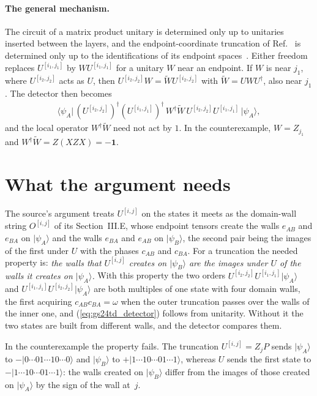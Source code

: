 \documentclass{article}
\begin{document}
\paragraph{The general mechanism.} The circuit of a matrix product unitary is
determined only up to unitaries inserted between the layers, and the
endpoint-coordinate truncation of Ref.~\cite{FrancoRubio2025MPUGauging} is
determined only up to the identifications of its endpoint
spaces~\cite{gap:fbc25_truncated_symmetry_endpoint_unitarity_scope}. Either
freedom replaces $U^{[i_1,j_1]}$ by $WU^{[i_1,j_1]}$ for a unitary $W$ near an
endpoint. If $W$ is near $j_1$, where $U^{[i_2,j_2]}$ acts as $U$, then
$U^{[i_2,j_2]}W=\widetilde WU^{[i_2,j_2]}$ with $\widetilde W=UWU^\dagger$, also
near $j_1$. The detector then becomes
\begin{align}
    \langle\psi_A\rvert\,(U^{[i_2,j_2]})^\dagger(U^{[i_1,j_1]})^\dagger
    \,W^\dagger\widetilde W\,U^{[i_2,j_2]}U^{[i_1,j_1]}\,\lvert\psi_A\rangle,
    \label{eq:gs24td_dressing}
\end{align}
and the local operator $W^\dagger\widetilde W$ need not act by $1$. In
the counterexample, $W=Z_{j_1}$ and $W^\dagger\widetilde W=Z(XZX)=-\mathbf 1$.

\section{What the argument needs}

The source's argument treats $U^{[i,j]}$ on the states it meets as the
domain-wall string $O^{[i,j]}$ of its Section~III.E, whose endpoint tensors
create the walls $e_{AB}$ and $e_{BA}$ on $\lvert\psi_A\rangle$ and the walls
$e_{BA}$ and $e_{AB}$ on $\lvert\psi_B\rangle$, the second pair being the images
of the first under $U$ with the phases $c_{AB}$ and $c_{BA}$. For a truncation the
needed property is: \emph{the walls that $U^{[i,j]}$ creates on
    $\lvert\psi_B\rangle$ are the images under $U$ of the walls it creates on
    $\lvert\psi_A\rangle$.} With this property the two orders
$U^{[i_2,j_2]}U^{[i_1,j_1]}\lvert\psi_A\rangle$ and
$U^{[i_1,j_1]}U^{[i_2,j_2]}\lvert\psi_A\rangle$ are both multiples of one state
with four domain walls, the first acquiring $c_{AB}c_{BA}=\omega$ when the outer
truncation passes over the walls of the inner one, and
(\ref{eq:gs24td_detector}) follows from unitarity. Without it the two states are
built from different walls, and the detector compares them.

In the counterexample the property fails. The truncation
$U^{[i,j]}=Z_jP$ sends $\lvert\psi_A\rangle$ to $-\lvert0\cdots01\cdots10\cdots0\rangle$
and $\lvert\psi_B\rangle$ to $+\lvert1\cdots10\cdots01\cdots1\rangle$, whereas
$U$ sends the first state to $-\lvert1\cdots10\cdots01\cdots1\rangle$: the walls
created on $\lvert\psi_B\rangle$ differ from the images of those created on
$\lvert\psi_A\rangle$ by the sign of the wall at~$j$.
\end{document}
